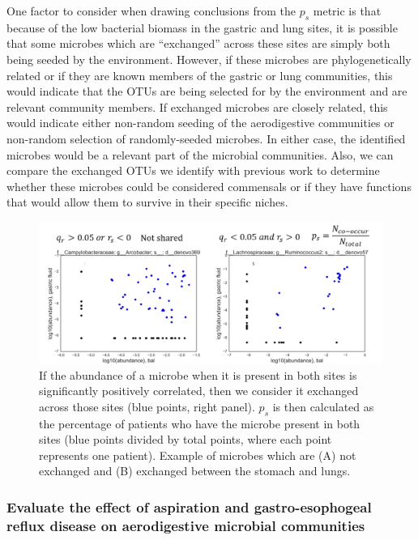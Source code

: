 \documentclass[12pt]{article}
\begin{document}
One factor to consider when drawing conclusions from the $p_s$ metric 
is that because of the low bacterial biomass in the gastric and lung 
sites, it is possible that some microbes which are ``exchanged'' across 
these sites are simply both being seeded by the environment. However, 
if these microbes are phylogenetically related or if they are known 
members of the gastric or lung communities, this would indicate that 
the OTUs are being selected for by the environment and are relevant 
community members. If exchanged microbes are closely related, this
would indicate either non-random seeding of the aerodigestive communities 
or non-random selection of randomly-seeded microbes. In either case, the
identified microbes would be a relevant part of the microbial communities.
Also, we can compare the exchanged OTUs we identify with previous work
to determine whether these microbes could be considered commensals or
if they have functions that would allow them to survive in their specific niches.

\begin{figure}
\begin{center}
    \includegraphics[scale=0.75]{sharedness_definition}
    \caption{If the abundance of a microbe when it is 
    present in both sites is significantly positively correlated, then we consider it exchanged 
    across those sites (blue points, right panel). $p_s$ is then calculated as the 
    percentage of patients who have the microbe present in both sites (blue 
    points divided by total points, where each point represents one patient). 
    Example of microbes which are (A) not exchanged and (B) exchanged between the 
    stomach and lungs.}\label{fig:sharedness_defn}
\end{center}
\end{figure}

\subsubsection{Evaluate the effect of aspiration and gastro-esophogeal reflux disease on aerodigestive microbial communities}
\end{document}
